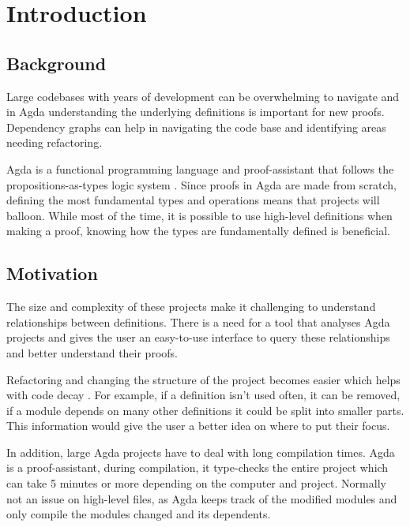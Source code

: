
\chapter{Introduction}


\section{Background}

Large codebases with years of development can be overwhelming to navigate
\cite{code_decay} and in Agda understanding the underlying definitions is
important for new proofs. Dependency graphs can help in navigating the code
base and identifying areas needing refactoring\cite{dep_grah_refactoring}.

Agda is a functional programming language and proof-assistant that
follows the propositions-as-types logic system \cite{agda_docs}. Since proofs
in Agda are made from scratch, defining the most fundamental types and
operations means that projects will balloon. While most of the time, it
is possible to use high-level definitions when making a proof, knowing how the
types are fundamentally defined is beneficial. 

\section{Motivation}

The size and complexity of these projects make it challenging to understand
relationships between definitions. There is a need for a tool that analyses
Agda projects and gives the user an easy-to-use interface to query these
relationships and better understand their proofs. 

Refactoring and changing the structure of the project becomes easier which
helps with code decay \cite{fowler2018refactoring}. For example, if a
definition isn't used often, it can be removed, if a module depends on many
other definitions it could be split into smaller parts. This information would
give the user a better idea on where to put their focus.

In addition, large Agda projects have to deal with long compilation times. Agda
is a proof-assistant, during compilation, it type-checks the entire project
which can take 5 minutes or more depending on the computer and project.
Normally not an issue on high-level files, as Agda keeps track of the
modified modules and only compile the modules changed and its dependents.

